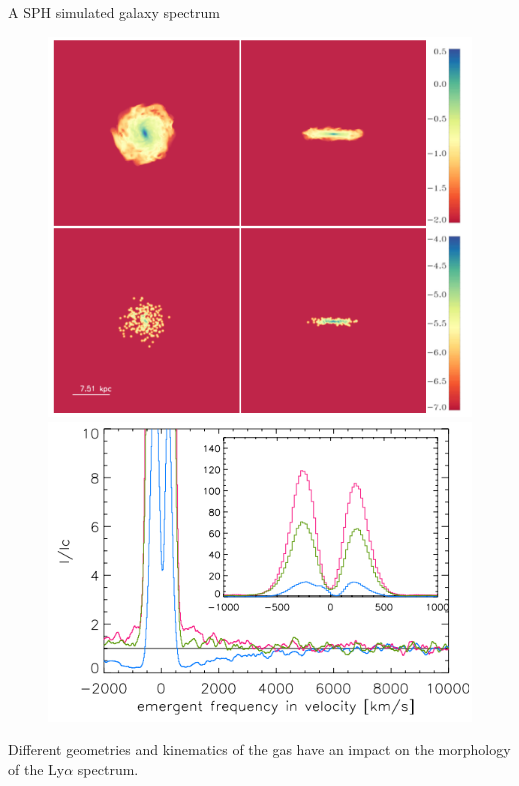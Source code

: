 \documentclass{beamer}
\begin{document}
\begin{frame}{A SPH simulated galaxy spectrum}
\begin{figure}
\includegraphics[scale=0.3]{Figures/verhamme1.png}
\includegraphics[scale=0.3]{Figures/Verhamme2.png}
\end{figure}
\end{frame}

\begin{frame}
\LARGE{Different geometries and kinematics of the gas have an impact on the morphology of the
Ly$\alpha$ spectrum.}\\

\end{frame}
\end{document}
